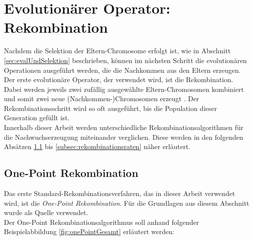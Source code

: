 \section{Evolutionärer Operator: Rekombination}
\label{sec:evolutionäreOperatoren}
Nachdem die Selektion der Eltern-Chromosome erfolgt ist, wie in Abschnitt \ref{sec:evalUndSelektion} beschrieben, können im nächsten Schritt die evolutionären Operationen ausgeführt werden, die die Nachkommen aus den Eltern erzeugen. \\
Der erste evolutionäre Operator, der verwendet wird, ist die Rekombination.
Dabei werden jeweils zwei zufällig ausgewählte Eltern-Chromosomen kombiniert und somit zwei neue (Nachkommen-)Chromosomen erzeugt \cite{kalkreuth_comprehensive_2020}. 
Der Rekombinationsschritt wird so oft ausgeführt, bis die Population dieser Generation gefüllt ist.\\
Innerhalb dieser Arbeit werden unterschiedliche Rekombinationsalgorithmen für die Nachwuchserzeugung miteinander verglichen.
Diese werden in den folgenden Absätzen \ref{subsubsec:onePointCrossover} bis \ref{subsec:rekombinationsraten} näher erläutert.

\subsection{One-Point Rekombination}
\label{subsubsec:onePointCrossover}
Das erste Standard-Rekombinationsverfahren, das in dieser Arbeit verwendet wird, ist die \emph{One-Point Rekombination}.
Für die Grundlagen aus diesem Abschnitt wurde \cite{pavai_survey_2017} als Quelle verwendet.\\
Der One-Point Rekombinationsalgorithmus soll anhand folgender Beispielabbildung \ref{fig:onePointGesamt} erläutert werden:

